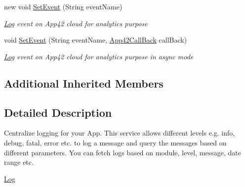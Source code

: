 \begin{DoxyCompactItemize}
new void \hyperlink{classcom_1_1shephertz_1_1app42_1_1paas_1_1sdk_1_1csharp_1_1log_1_1_log_service_afbfbf2ca59e964bbe0b36315cfe98180}{Set\+Event} (String event\+Name)
\begin{DoxyCompactList}\small\item\em \hyperlink{classcom_1_1shephertz_1_1app42_1_1paas_1_1sdk_1_1csharp_1_1log_1_1_log}{Log} event on App42 cloud for analytics purpose \end{DoxyCompactList}\item 
void \hyperlink{classcom_1_1shephertz_1_1app42_1_1paas_1_1sdk_1_1csharp_1_1log_1_1_log_service_adeab3abaa6a2e31b837df0f44632480c}{Set\+Event} (String event\+Name, \hyperlink{interfacecom_1_1shephertz_1_1app42_1_1paas_1_1sdk_1_1csharp_1_1_app42_call_back}{App42\+Call\+Back} call\+Back)
\begin{DoxyCompactList}\small\item\em \hyperlink{classcom_1_1shephertz_1_1app42_1_1paas_1_1sdk_1_1csharp_1_1log_1_1_log}{Log} event on App42 cloud for analytics purpose in async mode \end{DoxyCompactList}\end{DoxyCompactItemize}
\subsection*{Additional Inherited Members}


\subsection{Detailed Description}
Centralize logging for your App. This service allows different levels e.\+g. info, debug, fatal, error etc. to log a message and query the messages based on different parameters. You can fetch logs based on module, level, message, date range etc. 

\hyperlink{classcom_1_1shephertz_1_1app42_1_1paas_1_1sdk_1_1csharp_1_1log_1_1_log_service}{Log} 

